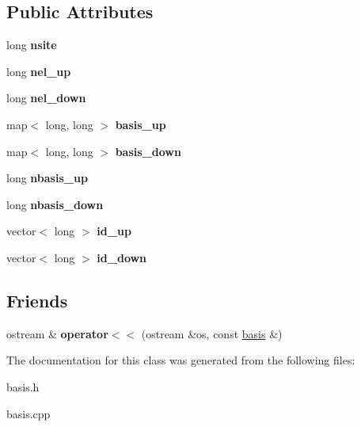 \subsection*{Public Attributes}
\begin{DoxyCompactItemize}
\item 
long {\bfseries nsite}\hypertarget{classbasis_a98ef7e9fb8e86e6ca40f9356741d02b8}{}\label{classbasis_a98ef7e9fb8e86e6ca40f9356741d02b8}

\item 
long {\bfseries nel\+\_\+up}\hypertarget{classbasis_abb8238ae962d05c706adc219b9fb8102}{}\label{classbasis_abb8238ae962d05c706adc219b9fb8102}

\item 
long {\bfseries nel\+\_\+down}\hypertarget{classbasis_a90ff415d09d178ef397ede3613579148}{}\label{classbasis_a90ff415d09d178ef397ede3613579148}

\item 
map$<$ long, long $>$ {\bfseries basis\+\_\+up}\hypertarget{classbasis_a001c54b2d5cb432e2152bca56c9fcd4b}{}\label{classbasis_a001c54b2d5cb432e2152bca56c9fcd4b}

\item 
map$<$ long, long $>$ {\bfseries basis\+\_\+down}\hypertarget{classbasis_a7bedd86a2fb0cf5c1fc74e9e681081ab}{}\label{classbasis_a7bedd86a2fb0cf5c1fc74e9e681081ab}

\item 
long {\bfseries nbasis\+\_\+up}\hypertarget{classbasis_a4aabed476d2bd06e63b9311218162ba3}{}\label{classbasis_a4aabed476d2bd06e63b9311218162ba3}

\item 
long {\bfseries nbasis\+\_\+down}\hypertarget{classbasis_aa0aa0f3d64766166d8b48ce5220dbf65}{}\label{classbasis_aa0aa0f3d64766166d8b48ce5220dbf65}

\item 
vector$<$ long $>$ {\bfseries id\+\_\+up}\hypertarget{classbasis_a091b97f80ddcc0697d1c1df710991564}{}\label{classbasis_a091b97f80ddcc0697d1c1df710991564}

\item 
vector$<$ long $>$ {\bfseries id\+\_\+down}\hypertarget{classbasis_ac3b970392d8b8b7cbada1d6959dadb98}{}\label{classbasis_ac3b970392d8b8b7cbada1d6959dadb98}

\end{DoxyCompactItemize}
\subsection*{Friends}
\begin{DoxyCompactItemize}
\item 
ostream \& {\bfseries operator$<$$<$} (ostream \&os, const \hyperlink{classbasis}{basis} \&)\hypertarget{classbasis_a1c883531921b9ccb0deaf3614d85502c}{}\label{classbasis_a1c883531921b9ccb0deaf3614d85502c}

\end{DoxyCompactItemize}


The documentation for this class was generated from the following files\+:\begin{DoxyCompactItemize}
\item 
basis.\+h\item 
basis.\+cpp\end{DoxyCompactItemize}
